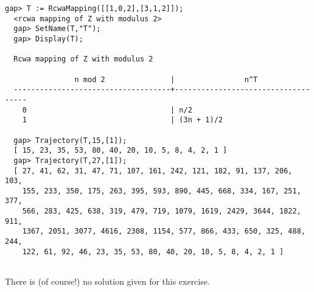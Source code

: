 \documentclass[a4paper,11pt]{report}
\begin{document}
{{{\begin{Verbatim}[fontsize=\small,frame=single,label=GAP session log]
  gap> T := RcwaMapping([[1,0,2],[3,1,2]]);
  <rcwa mapping of Z with modulus 2>
  gap> SetName(T,"T");
  gap> Display(T);
  
  Rcwa mapping of Z with modulus 2
  
                n mod 2               |                n^T
  ------------------------------------+------------------------------------
    0                                 | n/2
    1                                 | (3n + 1)/2
  
  gap> Trajectory(T,15,[1]);
  [ 15, 23, 35, 53, 80, 40, 20, 10, 5, 8, 4, 2, 1 ]
  gap> Trajectory(T,27,[1]);
  [ 27, 41, 62, 31, 47, 71, 107, 161, 242, 121, 182, 91, 137, 206, 103, 
    155, 233, 350, 175, 263, 395, 593, 890, 445, 668, 334, 167, 251, 377, 
    566, 283, 425, 638, 319, 479, 719, 1079, 1619, 2429, 3644, 1822, 911, 
    1367, 2051, 3077, 4616, 2308, 1154, 577, 866, 433, 650, 325, 488, 244, 
    122, 61, 92, 46, 23, 35, 53, 80, 40, 20, 10, 5, 8, 4, 2, 1 ]
  
\end{Verbatim}
 There is (of course!) no solution given for this exercise. }

 }

  }

       
\end{document}
